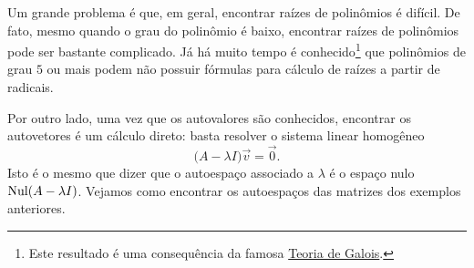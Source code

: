\documentclass[../livro.tex]{subfiles}  %
\begin{document}
Um grande problema é que, em geral, encontrar raízes de polinômios é difícil. De fato, mesmo quando o grau do polinômio é baixo, encontrar raízes de polinômios pode ser bastante complicado. Já há muito tempo é conhecido\footnote{Este resultado é uma consequência da famosa \href{https://pt.wikipedia.org/wiki/Teoria_de_Galois}{Teoria de Galois}.} que polinômios de grau $5$ ou mais podem não possuir fórmulas para cálculo de raízes a partir de radicais.

Por outro lado, uma vez que os autovalores são conhecidos, encontrar os autovetores é um cálculo direto: basta resolver o sistema linear homogêneo
\[
\big( A - \lambda I \big) \vec{v} = \vec{0}.
\] Isto é o mesmo que dizer que o autoespaço associado a $\lambda$ é o espaço nulo $\operatorname{Nul} (A - \lambda I)$. Vejamos como encontrar os autoespaços das matrizes dos exemplos anteriores.
\end{document}
